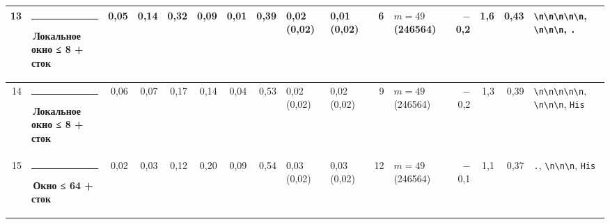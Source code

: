 \documentclass[10pt]{article}
\begin{document}
\begin{minipage}{\linewidth}
\begin{center}
{\begin{tabular}{|r|l|r|r|r|r|r|r|l|l|r|l|r|r|r|l|}
13 & \textcolor[HTML]{1BAF7A}{\rule{0.62em}{0.62em}}\,\textbf{Локальное окно ≤ 8 + сток} & 0,05 & 0,14 & 0,32 & 0,09 & 0,01 & 0,39 & 0,02 (0,02) & 0,01 (0,02) & 6 & $m{=}49$ (246564) & $-$0,2 & 1,6 & 0,43 & \texttt{\textvisiblespace{}\textbackslash{}n\textbackslash{}n\textbackslash{}n\textbackslash{}n\textbackslash{}n}, \texttt{\textvisiblespace{}\textbackslash{}n\textbackslash{}n\textbackslash{}n}, \texttt{\textvisiblespace{}.} \\ \hline
14 & \textcolor[HTML]{1BAF7A}{\rule{0.62em}{0.62em}}\,\textbf{Локальное окно ≤ 8 + сток} & 0,06 & 0,07 & 0,17 & 0,14 & 0,04 & 0,53 & 0,02 (0,02) & 0,02 (0,02) & 9 & $m{=}49$ (246564) & $-$0,2 & 1,3 & 0,39 & \texttt{\textvisiblespace{}\textbackslash{}n\textbackslash{}n\textbackslash{}n\textbackslash{}n\textbackslash{}n}, \texttt{\textvisiblespace{}\textbackslash{}n\textbackslash{}n\textbackslash{}n}, \texttt{\textvisiblespace{}His} \\ \hline
15 & \textcolor[HTML]{EDA100}{\rule{0.62em}{0.62em}}\,\textbf{Окно ≤ 64 + сток} & 0,02 & 0,03 & 0,12 & 0,20 & 0,09 & 0,54 & 0,03 (0,02) & 0,03 (0,02) & 12 & $m{=}49$ (246564) & $-$0,1 & 1,1 & 0,37 & \texttt{\textvisiblespace{}.}, \texttt{\textvisiblespace{}\textbackslash{}n\textbackslash{}n\textbackslash{}n}, \texttt{\textvisiblespace{}His} \\ \hline
\hline\end{tabular}}\end{center}
\end{minipage}
\par\vspace{0.4em}
\end{document}
